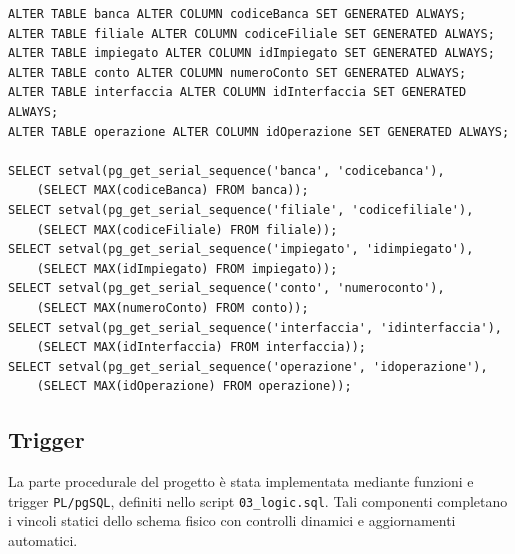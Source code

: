 \begin{lstlisting}[caption={Ripristino delle sequenze dopo il caricamento}]
ALTER TABLE banca ALTER COLUMN codiceBanca SET GENERATED ALWAYS;
ALTER TABLE filiale ALTER COLUMN codiceFiliale SET GENERATED ALWAYS;
ALTER TABLE impiegato ALTER COLUMN idImpiegato SET GENERATED ALWAYS;
ALTER TABLE conto ALTER COLUMN numeroConto SET GENERATED ALWAYS;
ALTER TABLE interfaccia ALTER COLUMN idInterfaccia SET GENERATED ALWAYS;
ALTER TABLE operazione ALTER COLUMN idOperazione SET GENERATED ALWAYS;

SELECT setval(pg_get_serial_sequence('banca', 'codicebanca'),
    (SELECT MAX(codiceBanca) FROM banca));
SELECT setval(pg_get_serial_sequence('filiale', 'codicefiliale'),
    (SELECT MAX(codiceFiliale) FROM filiale));
SELECT setval(pg_get_serial_sequence('impiegato', 'idimpiegato'),
    (SELECT MAX(idImpiegato) FROM impiegato));
SELECT setval(pg_get_serial_sequence('conto', 'numeroconto'),
    (SELECT MAX(numeroConto) FROM conto));
SELECT setval(pg_get_serial_sequence('interfaccia', 'idinterfaccia'),
    (SELECT MAX(idInterfaccia) FROM interfaccia));
SELECT setval(pg_get_serial_sequence('operazione', 'idoperazione'),
    (SELECT MAX(idOperazione) FROM operazione));
\end{lstlisting}

\subsection{Trigger}
La parte procedurale del progetto è stata implementata mediante funzioni e trigger \texttt{PL/pgSQL}, definiti nello script \texttt{03\_logic.sql}. Tali componenti completano i vincoli statici dello schema fisico con controlli dinamici e aggiornamenti automatici.

